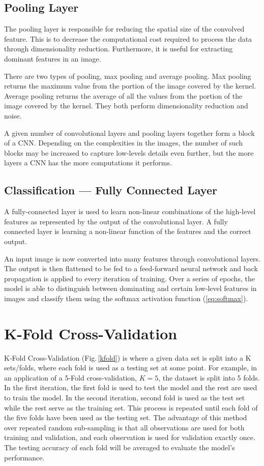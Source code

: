 \subsection{Pooling Layer}

The pooling layer is responsible for reducing the spatial size of the convolved feature. This is to decrease the computational cost required to process the data through dimensionality reduction. Furthermore, it is useful for extracting dominant features in an image.

There are two types of pooling, max pooling and average pooling. Max pooling returns the maximum value from the portion of the image covered by the kernel. Average pooling returns the average of all the values from the portion of the image covered by the kernel. They both perform dimensionality reduction and noise.

A given number of convolutional layers and pooling layers together form a block of a CNN. Depending on the complexities in the images, the number of such blocks may be increased to capture low-levels details even further, but the more layers a CNN has the more computations it performs.

\subsection{Classification — Fully Connected Layer}

A fully-connected layer is used to learn non-linear combinations of the high-level features as represented by the output of the convolutional layer. A fully connected layer is learning a non-linear function of the features and the correct output.

An input image is now converted into many features through convolutional layers. The output is then flattened to be fed to a feed-forward neural network and back propagation is applied to every iteration of training. Over a series of epochs, the model is able to distinguish between dominating and certain low-level features in images and classify them using the softmax activation function (\ref{eq:softmax}).

\section{K-Fold Cross-Validation}
\label{backgournd_kfold}
K-Fold Cross-Validation \citep{Kohavi95astudy} (Fig.\,\ref{kfold}) is where a given data set is split into a K sets/folds, where each fold is used as a testing set at some point. For example, in an application of a 5-Fold cross-validation, $K=5$, the dataset is split into 5 folds. In the first iteration, the first fold is used to test the model and the rest are used to train the model. In the second iteration, second fold is used as the test set while the rest serve as the training set. This process is repeated until each fold of the five folds have been used as the testing set. The advantage of this method over repeated random sub-sampling is that all observations are used for both training and validation, and each observation is used for validation exactly once. The testing accuracy of each fold will be averaged to evaluate the model's performance. 

